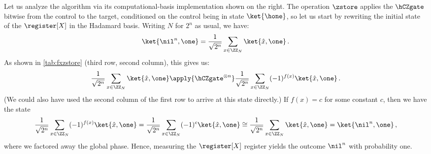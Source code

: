       Let us analyze the algorithm via its computational-basis implementation
        shown on the right.
        The operation $\zstore$ applies the $\hCZgate$
        bitwise from the control to the target, conditioned on the control being
        in state $\ket{\hone}$, so let us start by rewriting the
        initial state of the $\register[X]$ in the Hadamard basis. Writing $N$
        for $2^n$ as usual, we have:
      \[
        \ket{\nil^n, \one} 
          = \frac{1}{\sqrt{2^n}} \sum_{x \in \ZZ_{N}}
            \ket{\hat{x}, \one}\, .
      \]
      As shown in \cref{tab:fxzstore} (third row, second column), this gives us:
      \[
        \frac{1}{\sqrt{2^n}} \sum_{x \in \ZZ_{N}} 
          \ket{\hat{x}, \one}
        \apply{\hCZgate^{\otimes n}} 
        \frac{1}{\sqrt{2^n}} \sum_{x \in \ZZ_{N}} 
          (-1)^{f(x)} \ket{\hat x, \one}\, .
      \]
      (We could also have used the second column of the first row to arrive at
      this state directly.)
      If $f(x) = c$ for some constant $c$, then we have the state
      \[
        \frac{1}{\sqrt{2^n}} \sum_{x \in \ZZ_{N}} 
          (-1)^{f(x)} \ket{\hat x, \one}
        = \frac{1}{\sqrt{2^n}} \sum_{x \in \ZZ_{N}} 
          (-1)^{c} \ket{\hat x, \one}
        \cong 
        \frac{1}{\sqrt{2^n}} \sum_{x \in \ZZ_{N}} 
          \ket{\hat x, \one}
        = \ket{\nil^n, \one}\, ,
      \]
      where we factored away the global phase. Hence,
      measuring the $\register[X]$ register yields the outcome $\nil^n$
      with probability one.

